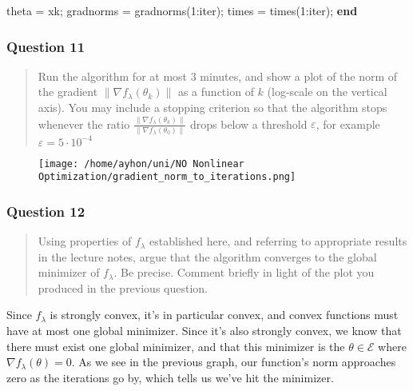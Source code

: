 \documentclass[
]{article}
\newenvironment{Shaded}{}{}
\newcommand{\FloatTok}[1]{\textcolor[rgb]{0.25,0.63,0.44}{#1}}
\newcommand{\KeywordTok}[1]{\textcolor[rgb]{0.00,0.44,0.13}{\textbf{#1}}}
\newcommand{\NormalTok}[1]{#1}
\newcommand{\OperatorTok}[1]{\textcolor[rgb]{0.40,0.40,0.40}{#1}}
\newcommand{\VariableTok}[1]{\textcolor[rgb]{0.10,0.09,0.49}{#1}}
\begin{document}
\begin{Shaded}
\begin{Highlighting}[]
    \VariableTok{theta} \OperatorTok{=} \VariableTok{xk}\OperatorTok{;}
    \VariableTok{gradnorms} \OperatorTok{=} \VariableTok{gradnorms}\NormalTok{(}\FloatTok{1}\OperatorTok{:}\VariableTok{iter}\NormalTok{)}\OperatorTok{;}
    \VariableTok{times} \OperatorTok{=} \VariableTok{times}\NormalTok{(}\FloatTok{1}\OperatorTok{:}\VariableTok{iter}\NormalTok{)}\OperatorTok{;}
\KeywordTok{end}
\end{Highlighting}
\end{Shaded}

\hypertarget{question-11}{%
\subsubsection{Question 11}\label{question-11}}

\begin{quote}
Run the algorithm for at most 3 minutes, and show a plot of the norm of
the gradient \(\lVert\nabla f_\lambda (\theta_k)\rVert\) as a function
of \(k\) (log-scale on the vertical axis). You may include a stopping
criterion so that the algorithm stops whenever the ratio
\(\frac{\lVert\nabla  f_\lambda (\theta_k )\rVert}{\lVert\nabla f_\lambda(\theta_0)\rVert}\)
drops below a threshold \(\varepsilon\), for example
\(\varepsilon = 5 · 10^{−4}\)
\end{quote}

\begin{figure}
\centering
\texttt{[image: /home/ayhon/uni/NO Nonlinear Optimization/gradient\_norm\_to\_iterations.png]}
\caption{}
\end{figure}

\hypertarget{question-12}{%
\subsubsection{Question 12}\label{question-12}}

\begin{quote}
Using properties of \(f_\lambda\) established here, and referring to
appropriate results in the lecture notes, argue that the algorithm
converges to the global minimizer of \(f_\lambda\). Be precise. Comment
briefly in light of the plot you produced in the previous question.
\end{quote}

Since \(f_\lambda\) is strongly convex, it's in particular convex, and
convex functions must have at most one global minimizer. Since it's also
strongly convex, we know that there must exist one global minimizer, and
that this minimizer is the \(\theta\in\mathcal{E}\) where
\(\nabla f_\lambda(\theta) =0\). As we see in the previous graph, our
function's norm approaches zero as the iterations go by, which tells us
we've hit the minimizer.
\end{document}
